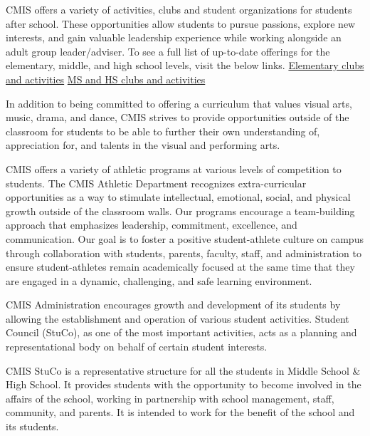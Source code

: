
CMIS offers a variety of activities, clubs and student organizations for students after school.  These opportunities allow students to pursue passions, explore new interests, and gain valuable leadership experience while working alongside an adult group leader/adviser.  To see a full list of up-to-date offerings for the elementary, middle, and high school levels, visit the below links.
\href{http://blogs.cmis.ac.th/eagles/clubs-activities/es/}{Elementary clubs and activities}
\href{http://blogs.cmis.ac.th/eagles/clubs-activities/ms-hs/}{MS and HS clubs and activities}


In addition to being committed to offering a curriculum that values visual arts, music, drama, and dance, CMIS strives to provide opportunities outside of the classroom for students to be able to further their own understanding of, appreciation for, and talents in the visual and performing arts.


CMIS offers a variety of athletic programs at various levels of competition to students.  The CMIS Athletic Department recognizes extra-curricular opportunities as a way to stimulate intellectual, emotional, social, and physical growth outside of the classroom walls.  Our programs encourage a team-building approach that emphasizes leadership, commitment, excellence, and communication.  Our goal is to foster a positive student-athlete culture on campus through collaboration with students, parents, faculty, staff, and administration to ensure student-athletes remain academically focused at the same time that they are engaged in a dynamic, challenging, and safe learning environment.


CMIS Administration encourages growth and development of its students by allowing the establishment and operation of various student activities. Student Council (StuCo), as one of the most important activities, acts as a planning and representational body on behalf of certain student interests.

CMIS StuCo is a representative structure for all the students in Middle School \& High School.  It provides students with the opportunity to become involved in the affairs of the school, working in partnership with school management, staff, community, and parents.  It is intended to work for the benefit of the school and its students. 
 
